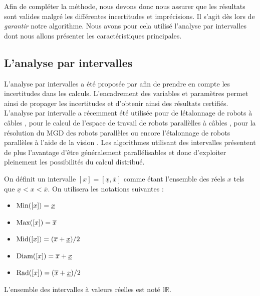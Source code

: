 Afin de compl\'eter la m\'ethode, nous devons donc nous assurer que les 
r\'esultats sont valides malgr\'e les diff\'erentes incertitudes et 
impr\'ecisions. Il s'agit d\`es lors de {\it garantir} notre algorithme. Nous 
avons pour cela utilis\'e l'analyse par intervalles dont nous allons pr\'esenter 
les caract\'eristiques principales.

\subsection{L'analyse par intervalles}

L'analyse par intervalles a \'et\'e propos\'ee par \cite{moore1968} afin de 
prendre en compte les incertitudes dans les calculs. L'encadrement des variables 
et param\`etres permet ainsi de propager les incertitudes et d'obtenir ainsi 
des r\'esultats certifi\'es. L'analyse par intervalle a r\'ecemment \'et\'e 
utilis\'ee pour de l\'etalonnage de robots \`a c\^ables \cite{sandretto2012}, 
pour le calcul de l'espace de travail de robots parall\`elles \`a c\^ables 
\cite{gouttefarde2011}, pour la r\'esolution du MGD des robots parall\`eles 
\cite{merlet2004solving} ou encore l'\'etalonnage de robots parall\`eles \`a 
l'aide de la vision \cite{daney2006interval}. Les algorithmes utilisant des 
intervalles pr\'esentent de plus l'avantage d'\^etre g\'en\'eralement 
parall\'elisables et donc d'exploiter pleinement les possibilit\'es du calcul 
distribu\'e.

On d\'efinit un intervalle $[x] = [\underline{x},\overline{x}]$ comme \'etant 
l'ensemble des r\'eels $x$ tels que $\underline{x} < x < \overline{x}$.
On utilisera les notations suivantes :
\begin{itemize}
 \item $\hbox{Min}([x]) = \underline{x}$
  \item $\hbox{Max}([x]) = \overline{x}$
  \item $\hbox{Mid}([x]) = (\overline{x} + \underline{x})/2$
   \item $\hbox{Diam}([x]) = \overline{x} + \underline{x}$
    \item $\hbox{Rad}([x]) = (\overline{x} + \underline{x})/2$
\end{itemize}

L'ensemble des intervalles \`a valeurs r\'eelles est not\'e $\mathbb I \mathbb 
R$.

